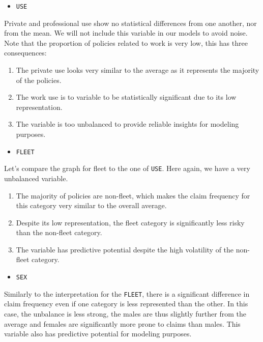 \documentclass[
  english,
  11pt,
]{article}
\providecommand{\tightlist}{%
  \setlength{\itemsep}{0pt}\setlength{\parskip}{0pt}}
\begin{document}
\begin{itemize}
\tightlist
\item
  \texttt{USE}
\end{itemize}

Private and professional use show no statistical differences from one
another, nor from the mean. We will not include this variable in our
models to avoid noise. Note that the proportion of policies related to
work is very low, this has three consequences:

\begin{enumerate}
\def\labelenumi{\arabic{enumi}.}
\tightlist
\item
  The private use looks very similar to the average as it represents the
  majority of the policies.
\item
  The work use is to variable to be statistically significant due to its
  low representation.
\item
  The variable is too unbalanced to provide reliable insights for
  modeling purposes.
\end{enumerate}

\begin{itemize}
\tightlist
\item
  \texttt{FLEET}
\end{itemize}

Let's compare the graph for fleet to the one of \texttt{USE}. Here
again, we have a very unbalanced variable.

\begin{enumerate}
\def\labelenumi{\arabic{enumi}.}
\tightlist
\item
  The majority of policies are non-fleet, which makes the claim
  frequency for this category very similar to the overall average.
\item
  Despite its low representation, the fleet category is significantly
  less risky than the non-fleet category.
\item
  The variable has predictive potential despite the high volatility of
  the non-fleet category.
\end{enumerate}

\begin{itemize}
\tightlist
\item
  \texttt{SEX}
\end{itemize}

Similarly to the interpretation for the \texttt{FLEET}, there is a
significant difference in claim frequency even if one category is less
represented than the other. In this case, the unbalance is less strong,
the males are thus slightly further from the average and females are
significantly more prone to claims than males. This variable also has
predictive potential for modeling purposes.
\end{document}
